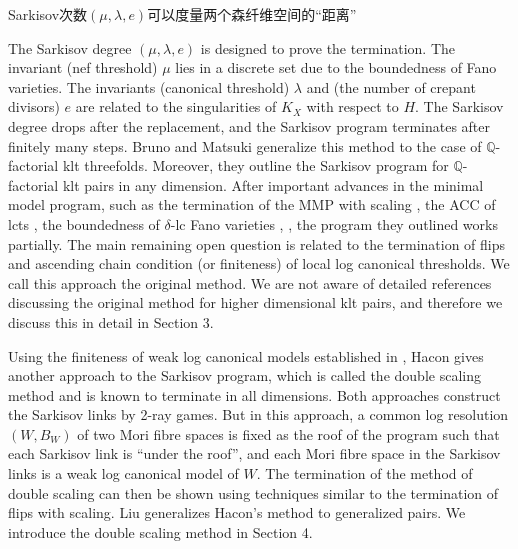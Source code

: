 Sarkisov次数$(\mu,\lambda,e)$可以度量两个森纤维空间的“距离”

The Sarkisov degree $(\mu,\lambda,e)$ is designed to prove the termination. The invariant (nef threshold) $\mu$ lies in a discrete set due  to the boundedness of Fano varieties. The invariants (canonical threshold) $\lambda$ and (the number of crepant divisors) $e$ are related to the singularities of $K_X$ with respect to $H$. 
The Sarkisov degree drops after the replacement, and the Sarkisov program terminates after finitely many steps. 
Bruno and Matsuki \cite{brunoLogSarkisovProgram1995} generalize this method to the case of $\mathbb{Q}$-factorial klt threefolds. Moreover, they outline the Sarkisov program for $\mathbb{Q}$-factorial klt pairs in any dimension.
After important advances in the minimal model program, such as the termination of the MMP with scaling \cite{BCHM10}, the ACC of lcts \cite{HMX14}, the boundedness of $\delta$-lc Fano varieties \cite{Bir19}, \cite{birkarSingularitiesLinearSystems2020}, the program they outlined works partially. The main remaining open question is related to the termination of flips and ascending chain condition (or finiteness) of local log canonical thresholds.
We call this approach the original method. We are not aware of detailed references discussing the original method for higher dimensional klt pairs, and therefore we discuss this in detail in Section 3. 

Using the finiteness of weak log canonical models established in \cite{BCHM10}, Hacon \cite{haconMinimalModelProgram2012} gives another approach to the Sarkisov program, which is called the double scaling method and is known to terminate in all dimensions. 
Both approaches construct the Sarkisov links by 2-ray games. 
But in this approach, a common log resolution $(W,B_W)$ of two Mori fibre spaces is fixed as the roof of the program such that each Sarkisov link is ``under the roof'', and each Mori fibre space in the Sarkisov links is a weak log canonical model of $W$. 
The termination of the method of double scaling can then be shown using techniques similar to the termination of flips with scaling.
Liu \cite{liuSarkisovProgramGeneralized2021} generalizes Hacon's method to generalized pairs.
 We introduce the double scaling method in Section 4.


